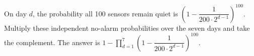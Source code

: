On day $d$, the probability all 100 sensors remain quiet is $\left(1-\dfrac{1}{200\cdot2^{d-1}}\right)^{100}$. Multiply these independent no-alarm probabilities over the seven days and take the complement. The answer is $\boxed{1-\displaystyle\prod_{d=1}^{7}\left(1-\dfrac{1}{200\cdot2^{d-1}}\right)^{100}}$.
